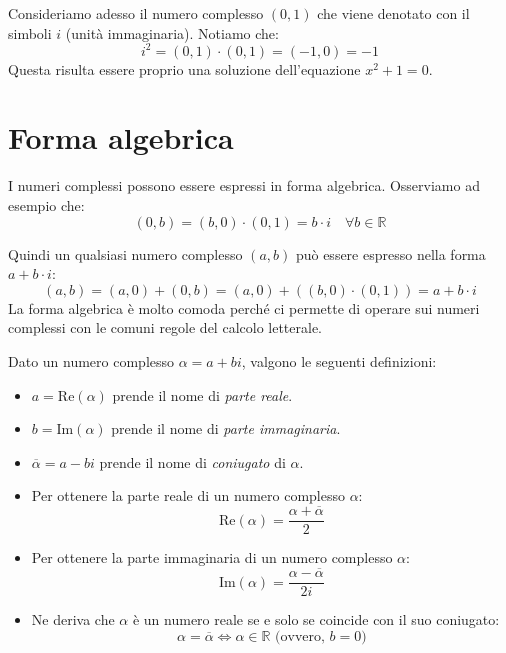 Consideriamo adesso il numero complesso $(0, 1)$ che viene denotato con il simboli $i$ (unità immaginaria). Notiamo che:
\[
i^2 = (0, 1) \cdot (0, 1) = (-1, 0) = -1
\]
Questa risulta essere proprio una soluzione dell'equazione $x^2 + 1 = 0$.

\section{Forma algebrica}
I numeri complessi possono essere espressi in forma algebrica. Osserviamo ad esempio che:
\[
(0, b) = (b, 0) \cdot (0, 1) = b \cdot i \quad \forall b \in \mathbb{R}
\]

Quindi un qualsiasi numero complesso $(a, b)$ può essere espresso nella forma $a + b \cdot i$:
\[
(a, b) = (a, 0) + (0, b) = (a, 0) + ((b, 0) \cdot (0, 1)) = a + b \cdot i
\]
La forma algebrica è molto comoda perché ci permette di operare sui numeri complessi con le comuni regole del calcolo letterale.

Dato un numero complesso $\alpha = a + bi$, valgono le seguenti definizioni:
\begin{itemize}
    \item $a = \text{Re}(\alpha)$ prende il nome di \emph{parte reale}.
    \item $b = \text{Im}(\alpha)$ prende il nome di \emph{parte immaginaria}.
    \item $\overline{\alpha} = a - bi$ prende il nome di \emph{coniugato} di $\alpha$.
      \ex{
\[
\frac{3 - 2i}{5 + i} \cdot \frac{\overline{z}}{\overline{z}} = \frac{(3-2i)(5-i)}{(5+i)(5-i)} =\frac{(3-2i)(5-i)}{26}
\]
}
      
    
    \item Per ottenere la parte reale di un numero complesso $\alpha$:
    \[
        \text{Re}(\alpha) = \frac{\alpha + \overline{\alpha}}{2}
    \]
    
    \item Per ottenere la parte immaginaria di un numero complesso $\alpha$:
    \[
        \text{Im}(\alpha) = \frac{\alpha - \overline{\alpha}}{2i}
    \]
    
    \item Ne deriva che $\alpha$ è un numero reale se e solo se coincide con il suo coniugato:
    \[
        \alpha = \overline{\alpha} \iff \alpha \in \mathbb{R} \text{ (ovvero, } b = 0 \text{)}
    \]
  \end{itemize}
  
